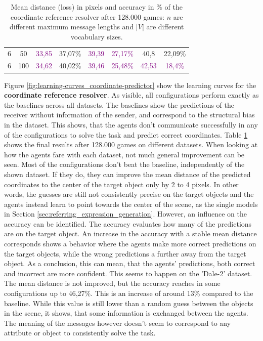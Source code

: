 \begin{table}[ht]
\begin{tabular}{cc|cc|cc|cc}
        {6}                           & {50}    & \textcolor{purple}{33,85}           & {37,07\%}                           & \textcolor{purple}{39,39}                & \textcolor{purple}{27,17\%} & {40,8}                    & {22,09\%}                   \\
        {6}                           & {100}   & \textcolor{purple}{34,62}           & {40,02\%}                           & \textcolor{purple}{39,46}                & \textcolor{purple}{25,48\%} & \textcolor{purple}{42,53} & \textcolor{purple}{18,4\%}  \\
        \bottomrule
    \end{tabular}
    \caption{Mean distance (loss) in pixels and accuracy in \% of the coordinate reference resolver after 128.000 games: $n$ are different maximum message lengths and $|V|$ are different vocabulary sizes.}
    \label{tab:results:coordinate-reference-resolver-game}
\end{table}

Figure \ref{fig:learning-curves_coordinate-predictor} show the learning curves for the \textbf{coordinate reference resolver}.
As visible, all configurations perform exactly as the baselines across all datasets.
The baselines show the predictions of the receiver without information of the sender, and correspond to the structural bias in the dataset.
This shows, that the agents don't communicate successfully in any of the configurations to solve the task and predict correct coordinates.
Table \ref{tab:results:coordinate-reference-resolver-game} shows the final results after 128.000 games on different datasets.
When looking at how the agents fare with each dataset, not much general improvement can be seen.
Most of the configurations don't beat the baseline, independently of the shown dataset.
If they do, they can improve the mean distance of the predicted coordinates to the center of the target object only by 2 to 4 pixels.
In other words, the guesses are still not consistently precise on the target objects and the agents instead learn to point towards the center of the scene, as the single models in Section \ref{sec:referring_expression_generation}.
However, an influence on the accuracy can be identified.
The accuracy evaluates how many of the predictions are on the target object.
An increase in the accuracy with a stable mean distance corresponds shows a behavior where the agents make more correct predictions on the target objects, while the wrong predictions a further away from the target object.
As a conclusion, this can mean, that the agents' predictions, both correct and incorrect are more confident.
This seems to happen on the 'Dale-2' dataset.
The mean distance is not improved, but the accuracy reaches in some configurations up to 46,27\%.
This is an increase of around 13\% compared to the baseline.
While this value is still lower than a random guess between the objects in the scene, it shows, that some information is exchanged between the agents.
The meaning of the messages however doesn't seem to correspond to any attribute or object to consistently solve the task.

